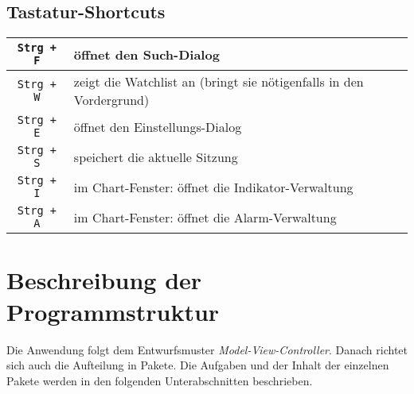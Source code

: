 \documentclass[fontsize=12pt, paper=a4, pagesize=auto, twoside=false, DIV=11, draft=false]{scrartcl}
\begin{document}
\subsection{Tastatur-Shortcuts}
\begin{table}[!h]
\begin{tabular}{|c|l|} \hline
\texttt{Strg + F} & öffnet den Such-Dialog \\ \hline
\texttt{Strg + W} & zeigt die Watchlist an (bringt sie nötigenfalls in den Vordergrund) \\ \hline
\texttt{Strg + E} & öffnet den Einstellungs-Dialog \\ \hline
\texttt{Strg + S} & speichert die aktuelle Sitzung \\ \hline
\texttt{Strg + I} & im Chart-Fenster: öffnet die Indikator-Verwaltung\\ \hline
\texttt{Strg + A} & im Chart-Fenster: öffnet die Alarm-Verwaltung \\ \hline

\end{tabular}
\end{table}

\section{Beschreibung der Programmstruktur}
\label{sec:Programmstruktur}
Die Anwendung folgt dem Entwurfsmuster \textit{Model-View-Controller}. Danach richtet sich auch die Aufteilung in Pakete. Die Aufgaben und der Inhalt der einzelnen Pakete werden in den folgenden Unterabschnitten beschrieben.
\end{document}
